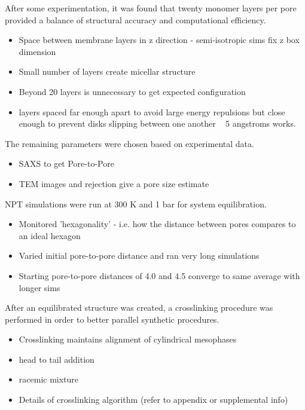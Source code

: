 \documentclass{article}
\begin{document}
	After some experimentation, it was found that twenty monomer layers per pore provided a balance of structural accuracy and computational efficiency. 
	\begin{itemize}
		\item Space between membrane layers in z direction - semi-isotropic sims fix z box dimension
		\item Small number of layers create micellar structure
		\item Beyond 20 layers is unnecessary to get expected configuration
		\item layers spaced far enough apart to avoid large energy repulsions but close enough to prevent disks slipping between one another ~ 5 angstroms works.
	\end{itemize}
	
	\noindent The remaining parameters were chosen based on experimental data. 
	\begin{itemize}
		\item SAXS to get Pore-to-Pore
		\item TEM images and rejection give a pore size estimate
	\end{itemize}
	
	\noindent NPT simulations were run at 300 K and 1 bar for system equilibration.
	\begin{itemize}
		\item Monitored 'hexagonality' - i.e. how the distance between pores compares to an ideal hexagon
		\item Varied initial pore-to-pore distance and ran very long simulations
		\item Starting pore-to-pore distances of 4.0 and 4.5 converge to same average with longer sims 
	\end{itemize}
	
	After an equilibrated structure was created, a crosslinking procedure was performed in order to better parallel synthetic procedures. 
	\begin{itemize}
		\item Crosslinking maintains alignment of cylindrical mesophases
		\item head to tail addition
		\item racemic mixture 
		\item Details of crosslinking algorithm (refer to appendix or supplemental info)
	\end{itemize}  
	
\end{document}

